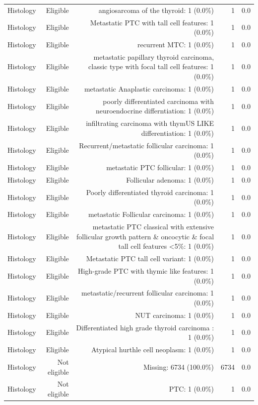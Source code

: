 \begin{table}[htbp]
\begin{tabular}{lrrrr}
Histology & Eligible & angiosarcoma of the thyroid: 1 (0.0\%) & 1 & 0.0 \\
Histology & Eligible & Metastatic PTC with tall cell features: 1 (0.0\%) & 1 & 0.0 \\
Histology & Eligible & recurrent MTC: 1 (0.0\%) & 1 & 0.0 \\
Histology & Eligible &   metastatic papillary thyroid carcinoma, classic type with focal tall cell features: 1 (0.0\%) & 1 & 0.0 \\
Histology & Eligible & metastatic Anaplastic carcinoma: 1 (0.0\%) & 1 & 0.0 \\
Histology & Eligible & poorly differentiated carcinoma with neuroendocrine differntiation: 1 (0.0\%) & 1 & 0.0 \\
Histology & Eligible &   infiltrating carcinoma with thymUS LIKE differentiation: 1 (0.0\%) & 1 & 0.0 \\
Histology & Eligible & Recurrent/metastatic follicular carcinoma: 1 (0.0\%) & 1 & 0.0 \\
Histology & Eligible &  metastatic PTC follicular: 1 (0.0\%) & 1 & 0.0 \\
Histology & Eligible & Follicular adenoma: 1 (0.0\%) & 1 & 0.0 \\
Histology & Eligible &  Poorly differentiated thyroid carcinoma: 1 (0.0\%) & 1 & 0.0 \\
Histology & Eligible & metastatic Follicular carcinoma: 1 (0.0\%) & 1 & 0.0 \\
Histology & Eligible & metastatic PTC classical with extensive follicular growth pattern \& oncocytic \& focal tall cell features <5\%: 1 (0.0\%) & 1 & 0.0 \\
Histology & Eligible & Metastatic PTC tall cell variant: 1 (0.0\%) & 1 & 0.0 \\
Histology & Eligible & High-grade PTC with thymic like features: 1 (0.0\%) & 1 & 0.0 \\
Histology & Eligible & metastatic/recurrent follicular carcinoma: 1 (0.0\%) & 1 & 0.0 \\
Histology & Eligible & NUT carcinoma: 1 (0.0\%) & 1 & 0.0 \\
Histology & Eligible & Differentiated high grade thyroid carcinoma : 1 (0.0\%) & 1 & 0.0 \\
Histology & Eligible & Atypical hurthle cell neoplasm: 1 (0.0\%) & 1 & 0.0 \\
Histology & Not eligible & Missing: 6734 (100.0\%) & 6734 & 0.0 \\
Histology & Not eligible & PTC: 1 (0.0\%) & 1 & 0.0 \\
\bottomrule
\end{tabular}
\end{table}

